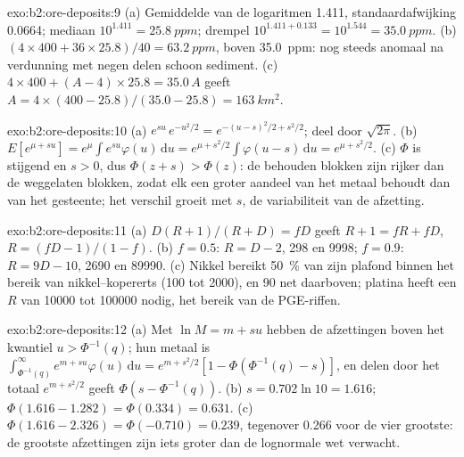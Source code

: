 \begin{solution}{exo:b2:ore-deposits:9}
(a) Gemiddelde van de logaritmen 1.411, standaardafwijking 0.0664; mediaan $10^{1.411} = \qty{25.8}{ppm}$;
drempel $10^{1.411 + 0.133} = 10^{1.544} = \qty{35.0}{ppm}$. (b) $(4 \times 400 + 36 \times 25.8)/40 =
\qty{63.2}{ppm}$, boven \qty{35.0}{ppm}: nog steeds anomaal na verdunning met negen delen schoon
sediment. (c) $4 \times 400 + (A - 4) \times 25.8 = 35.0\,A$ geeft $A = 4 \times (400 -
25.8)/(35.0 - 25.8) = \qty{163}{km^2}$.
\end{solution}

\begin{solution}{exo:b2:ore-deposits:10}
(a) $e^{su}\,e^{-u^2/2} = e^{-(u - s)^2/2 + s^2/2}$; deel door $\sqrt{2\pi}$. (b) $E[e^{\mu + su}] =
e^{\mu}\int e^{su}\varphi(u)\,\mathrm{d}u = e^{\mu + s^2/2}\int\varphi(u - s)\,\mathrm{d}u = e^{\mu +
s^2/2}$. (c) $\Phi$ is stijgend en $s > 0$, dus $\Phi(z + s) > \Phi(z)$: de behouden blokken zijn rijker dan
de weggelaten blokken, zodat elk  een groter aandeel van het metaal behoudt dan van het gesteente; het
verschil groeit met $s$, de variabiliteit van de afzetting.
\end{solution}

\begin{solution}{exo:b2:ore-deposits:11}
(a) $D(R + 1)/(R + D) = fD$ geeft $R + 1 = fR + fD$, $R = (fD - 1)/(1 - f)$. (b) $f = 0.5$: $R = D - 2$,
298 en \num{9998}; $f = 0.9$: $R = 9D - 10$, \num{2690} en \num{89990}. (c) Nikkel bereikt
\qty{50}{\percent} van zijn plafond binnen het bereik van nikkel--kopererts (100 tot \num{2000}), en 90 net daarboven;
platina heeft een $R$ van \num{10000} tot \num{100000} nodig, het bereik van de PGE-riffen.
\end{solution}

\begin{solution}{exo:b2:ore-deposits:12}
(a) Met $\ln M = m + s u$ hebben de afzettingen boven het kwantiel $u > \Phi^{-1}(q)$; hun metaal is
$\int_{\Phi^{-1}(q)}^{\infty} e^{m + su}\varphi(u)\,\mathrm{d}u = e^{m + s^2/2}[1 - \Phi(\Phi^{-1}(q) -
s)]$, en delen door het totaal $e^{m + s^2/2}$ geeft $\Phi(s - \Phi^{-1}(q))$. (b) $s = 0.702 \ln 10 =
1.616$; $\Phi(1.616 - 1.282) = \Phi(0.334) = 0.631$. (c) $\Phi(1.616 - 2.326) = \Phi(-0.710) = 0.239$,
tegenover 0.266 voor de vier grootste: de grootste afzettingen zijn iets groter dan de lognormale
wet verwacht.
\end{solution}

